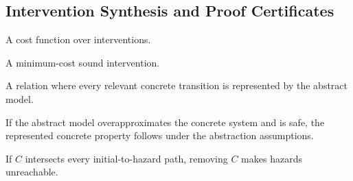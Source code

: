 \subsection{Intervention Synthesis and Proof Certificates}

\begin{definition}
A cost function over interventions.
\end{definition}

\begin{definition}
A minimum-cost sound intervention.
\end{definition}

\begin{definition}
A relation where every relevant concrete transition is represented by the abstract model.
\end{definition}

\begin{theorem}
If the abstract model overapproximates the concrete system and is safe, the represented concrete property follows under the abstraction assumptions.
\end{theorem}

\begin{theorem}
If $C$ intersects every initial-to-hazard path, removing $C$ makes hazards unreachable.
\end{theorem}
